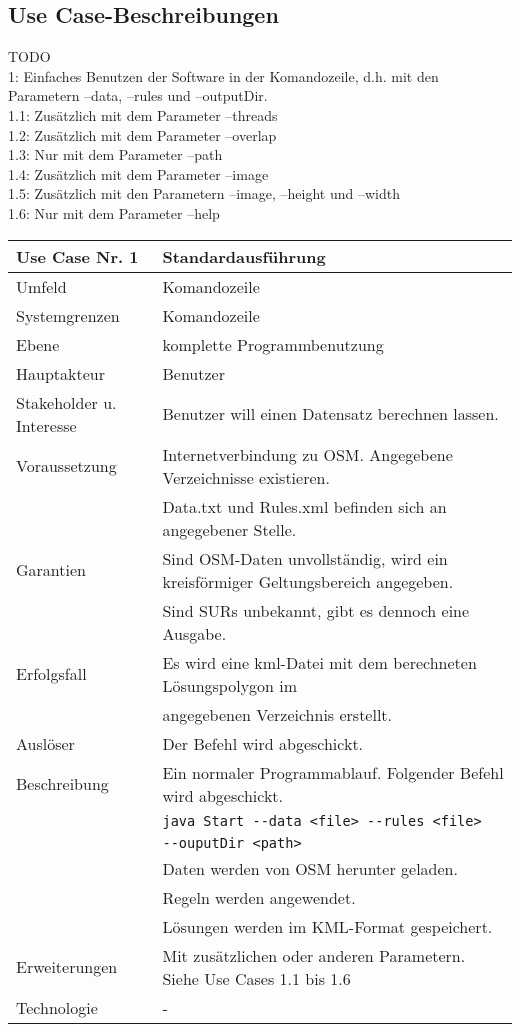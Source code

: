 \subsection{Use Case-Beschreibungen}
TODO\\
1: Einfaches Benutzen der Software in der Komandozeile, d.h. mit den Parametern --data, --rules und --outputDir.\\
1.1: Zusätzlich mit dem Parameter --threads\\
1.2: Zusätzlich mit dem Parameter --overlap\\
1.3: Nur mit dem Parameter --path\\
1.4: Zusätzlich mit dem Parameter --image\\
1.5: Zusätzlich mit den Parametern --image, --height und --width\\
1.6: Nur mit dem Parameter --help\\
\begin{tabular}{| l | l |}
 \hline
 \textbf{Use Case Nr. 1} & Standardausführung\\
 \hline
 Umfeld & Komandozeile\\
 \hline
 Systemgrenzen & Komandozeile\\
 \hline
 Ebene & komplette Programmbenutzung\\
 \hline
 Hauptakteur & Benutzer\\
 \hline
 Stakeholder u. Interesse & Benutzer will einen Datensatz berechnen lassen.\\
 \hline
 Voraussetzung & Internetverbindung zu OSM. Angegebene Verzeichnisse existieren.\\
	      & Data.txt und Rules.xml befinden sich an angegebener Stelle. \\
 \hline
 Garantien & Sind OSM-Daten unvollständig, wird ein kreisförmiger Geltungsbereich angegeben.\\
	  & Sind SURs unbekannt, gibt es dennoch eine Ausgabe.\\
 \hline
 Erfolgsfall & Es wird eine kml-Datei mit dem berechneten Lösungspolygon im\\
	    & angegebenen Verzeichnis erstellt.\\
 \hline
 Auslöser & Der Befehl wird abgeschickt.\\
 \hline
 Beschreibung & Ein normaler Programmablauf. Folgender Befehl wird abgeschickt.\\
	    & \verb|java Start --data <file> --rules <file>|\\
	    & \hspace{24pt} \verb|--ouputDir <path>|\\
	    & Daten werden von OSM herunter geladen.\\
	    & Regeln werden angewendet.\\
	    & Lösungen werden im KML-Format gespeichert.\\
 \hline
 Erweiterungen & Mit zusätzlichen oder anderen Parametern. Siehe Use Cases 1.1 bis 1.6\\
 \hline
 Technologie & -\\
 \hline
\end{tabular}
